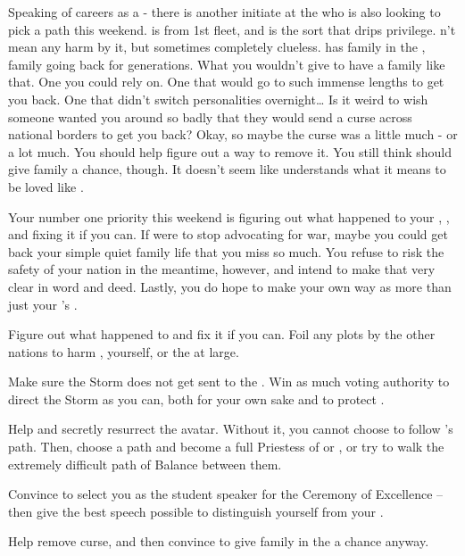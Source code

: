 \documentclass[char]{GL2020}
\begin{document}
Speaking of careers as a \cWarlordDaughter{\cleric} - there is another initiate at the \pSchool{} who is also looking to pick a path this weekend. \cInitiate{\full} is from 1st fleet, and is the sort that drips privilege. \cInitiate{\They} \cInitiate{\does}n't mean any harm by it, but sometimes \cInitiate{\theyare} completely clueless. \cInitiate{} has family in the \pFarm{}, family going back for generations. What you wouldn't give to have a family like that. One you could rely on. One that would go to such immense lengths to get you back. One that didn't switch personalities overnight\ldots{} Is it weird to wish someone wanted you around so badly that they would send a curse across national borders to get you back? Okay, so maybe the curse was a little much - or a lot much. You should help \cInitiate{} figure out a way to remove it. You still think \cInitiate{\they} should give \cInitiate{\their} family a chance, though. It doesn't seem like \cInitiate{} understands what it means to be loved like \cInitiate{\theyare}.

Your number one priority this weekend is figuring out what happened to your \cLoud{\parent}, \cLoud{}, and fixing it if you can. If \cLoud{\they} were to stop advocating for war, maybe you could get back your simple quiet family life that you miss so much. You refuse to risk the safety of your nation in the meantime, however, and intend to make that very clear in word and deed. Lastly, you do hope to make your own way as more than just your \cLoud{\parent}'s \cWarlordDaughter{\child}.

\begin{itemz}
	\item Figure out what happened to \cLoud{} and fix it if you can. Foil any plots by the other nations to harm \cLoud{}, yourself, or the \pShip{} at large.
	\item Make sure the Storm does not get sent to the \pShip{}. Win as much voting authority to direct the Storm as you can, both for your own sake and to protect \pShip{}. 
	\item Help \cFlowPriest{} and \cEbbPriest{} secretly resurrect the \cEbb{} avatar. Without it, you cannot choose to follow \cEbb{}'s path. Then, choose a path and become a full Priestess of \cEbb{} or \cFlow{}, or try to walk the extremely difficult path of Balance between them.
	\item Convince \cMusic{} to select you as the student speaker for the Ceremony of Excellence -- then give the best speech possible to distinguish yourself from your \cLoud{\parent}.
	\item Help \cInitiate{} remove \cInitiate{\their} curse, and then convince \cInitiate{\them} to give \cInitiate{\their} family in the \pFarm{} a chance anyway.
\end{itemz}
\end{document}
